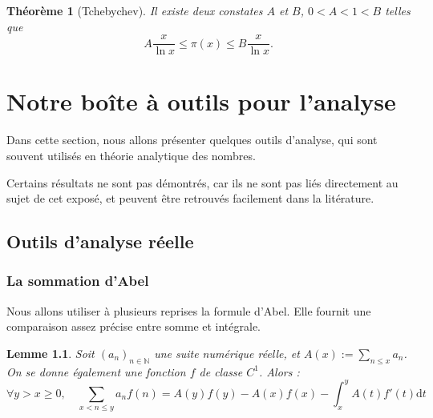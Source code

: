 \documentclass[french]{report}
\newtheorem{theorem}{Théorème}[section]
\newtheorem{lemma}[theorem]{Lemme}
\begin{document}
\begin{theorem}[Tchebychev]
  Il existe deux constates $A$ et $B$, $0<A<1<B$ telles que
  \[
    A\frac{x}{\ln x}\leq\pi(x)\leq B\frac{x}{\ln x}.
  \]
\end{theorem}

\chapter{Notre boîte à outils pour l'analyse}

Dans cette section, nous allons présenter quelques outils d'analyse, qui sont souvent utilisés en théorie analytique des nombres.

Certains résultats ne sont pas démontrés, car ils ne sont pas liés directement au sujet de cet exposé, et peuvent être retrouvés facilement dans la litérature.

\section{Outils d'analyse réelle}

\subsection{La sommation d'Abel}

Nous allons utiliser à plusieurs reprises la formule d'Abel. Elle fournit une comparaison assez précise entre somme et intégrale.

\begin{lemma}\label{lem:formule-abel}
  Soit $(a_n)_{n\in\mathbb{N}}$ une suite numérique réelle, et $A(x):=\sum_{n\leq x}a_n$. On se donne également une fonction $f$ de classe $C^1$. Alors :
  \[ \forall y>x\geq0,\quad
  \sum_{x<n\leq y} a_n f(n)
  = A(y)f(y) - A(x)f(x)
  - \int_x^yA(t)f'(t)\mathrm{d}t
  \]
\end{lemma}
\end{document}
